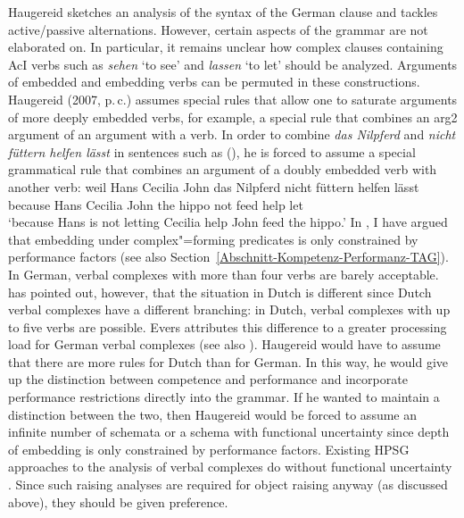 \begin{exe}
\begin{xlist}[iv.]
\begin{exe}
\begin{xlist}[iv.]
Haugereid sketches an analysis of the syntax of the German clause and tackles active/passive alternations.
However, certain aspects of the grammar are not elaborated on. In particular, it remains unclear how complex clauses containing AcI verbs such as
\emph{sehen} `to see' and \emph{lassen} `to let' should be analyzed. Arguments of embedded and embedding verbs can be permuted in
these constructions. Haugereid (2007, p.\,c.) assumes special rules that allow one to saturate arguments of more deeply embedded verbs, for example,
a special rule that combines an arg2 argument of an argument with a verb. In order to combine \emph{das Nilpferd} and \emph{nicht füttern helfen
  lässt} in sentences such as (), he is forced to assume a special grammatical rule that combines an argument of a doubly embedded verb with another verb:
\ea
\label{ex-nilpferd-fuettern-helfen-laesst}
\gll weil    Hans Cecilia John das Nilpferd nicht füttern helfen lässt\\
     because Hans Cecilia John the hippo not feed help let\\
\glt `because Hans is not letting Cecilia help John feed the hippo.'
\z
In \citet[]{Mueller2004b}, I have argued that embedding under complex"=forming predicates is only constrained by performance factors
(see also Section~\ref{Abschnitt-Kompetenz-Performanz-TAG}). In German, verbal complexes with more than four verbs are barely acceptable.
\citet[--59]{Evers75a} has pointed out, however, that the situation in Dutch is different since Dutch verbal complexes have a different branching:
in Dutch, verbal complexes with up to five verbs are possible. Evers attributes this difference to a greater processing load for German verbal complexes
(see also \citealp[Section~3.7]{Gibson98a}). Haugereid would have to assume that there are more rules
for Dutch than for German. In this way, he would give up the distinction between competence and
performance and incorporate performance restrictions directly into the grammar. If he wanted to maintain a distinction between the two, then Haugereid would
be forced to assume an infinite number of schemata or a schema with functional uncertainty since depth of embedding is only
constrained by performance factors. Existing HPSG approaches to the analysis of verbal complexes do
without functional uncertainty \citep{HN94a}.
Since such raising analyses are required for object raising anyway (as discussed above), they should be given preference.


\end{xlist}
\end{exe}
\end{xlist}
\end{exe}
